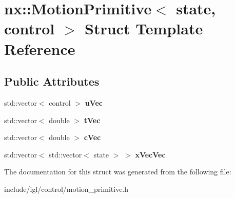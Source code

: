 \hypertarget{structnx_1_1MotionPrimitive}{}\section{nx\+:\+:Motion\+Primitive$<$ state, control $>$ Struct Template Reference}
\label{structnx_1_1MotionPrimitive}
\subsection*{Public Attributes}
\begin{DoxyCompactItemize}
\item 
\mbox{\label{structnx_1_1MotionPrimitive_a93fbe0fb639ee62f390b399645659902}} 
std\+::vector$<$ control $>$ {\bfseries u\+Vec}
\item 
\mbox{\label{structnx_1_1MotionPrimitive_a9858d9ae6dadb78739960772b6d875dd}} 
std\+::vector$<$ double $>$ {\bfseries t\+Vec}
\item 
\mbox{\label{structnx_1_1MotionPrimitive_ad4cdba5c6072b481564a521c3a730c2c}} 
std\+::vector$<$ double $>$ {\bfseries c\+Vec}
\item 
\mbox{\label{structnx_1_1MotionPrimitive_a06959333d07df1b73002acc375e5e4c4}} 
std\+::vector$<$ std\+::vector$<$ state $>$ $>$ {\bfseries x\+Vec\+Vec}
\end{DoxyCompactItemize}


The documentation for this struct was generated from the following file\+:\begin{DoxyCompactItemize}
\item 
include/igl/control/motion\+\_\+primitive.\+h\end{DoxyCompactItemize}
